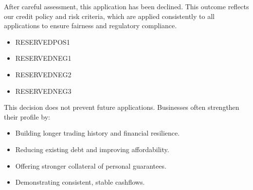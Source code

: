 \documentclass[a4paper,12pt]{article} %
\begin{document}
	
\bigskip

\bigskip

\noindent After careful assessment, this application has been declined.
This outcome reflects our credit policy and risk criteria, which are applied consistently to all
applications to ensure fairness and regulatory compliance.

\noindent %
\makebox[\linewidth]{\rule{\textwidth}{0.2pt}} %
\smallskip

\begin{itemize}
	\item   RESERVEDPOS1
\end{itemize}

\noindent %
\makebox[\linewidth]{\rule{\textwidth}{0.2pt}} %
\smallskip

\smallskip

\begin{itemize}
	\item  RESERVEDNEG1
	\item  RESERVEDNEG2
	\item  RESERVEDNEG3
\end{itemize}

\noindent %
\makebox[\linewidth]{\rule{\textwidth}{0.2pt}}
\smallskip

\medskip



\noindent This decision does not prevent future applications. Businesses often strengthen their profile by:
\begin{itemize}
	\item Building longer trading history and financial resilience.
	\item  Reducing existing debt and improving affordability.
	\item  Offering stronger collateral of personal guarantees.
	\item  Demonstrating consistent, stable cashflows.
\end{itemize}
\end{document}
